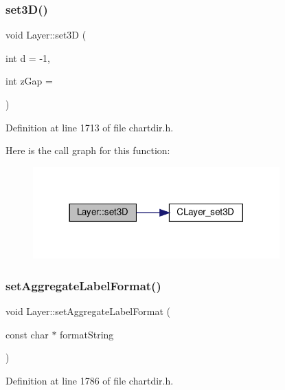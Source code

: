 \subsubsection{\texorpdfstring{set3\+D()}{set3D()}}
{\footnotesize\ttfamily void Layer\+::set3D (\begin{DoxyParamCaption}\item[{int}]{d = {\ttfamily -\/1},  }\item[{int}]{z\+Gap = {} }\end{DoxyParamCaption})\hspace{0.3cm}{\ttfamily [inline]}}



Definition at line 1713 of file chartdir.\+h.

Here is the call graph for this function\+:
\nopagebreak
\begin{figure}[H]
\begin{center}
\leavevmode
\includegraphics[width=269pt]{class_layer_abea35b3036cda42bbcb7f483004ebf8e_cgraph}
\end{center}
\end{figure}
\mbox{\label{class_layer_a30589e1186d9fb1abcbc03782fbb1ae4}} 
\subsubsection{\texorpdfstring{set\+Aggregate\+Label\+Format()}{setAggregateLabelFormat()}}
{\footnotesize\ttfamily void Layer\+::set\+Aggregate\+Label\+Format (\begin{DoxyParamCaption}\item[{const char $\ast$}]{format\+String }\end{DoxyParamCaption})\hspace{0.3cm}{\ttfamily [inline]}}



Definition at line 1786 of file chartdir.\+h.

